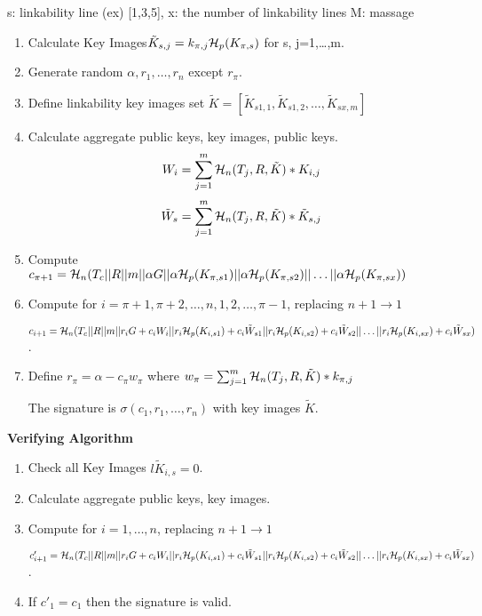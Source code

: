     s: linkability line (ex) [1,3,5],  x: the number of linkability lines M: massage
    \begin{enumerate}
        \item Calculate Key Images$\tilde{K}_{s,j}=k_{\pi,j}{\cal H}_{p} (K_{\pi,s})$ for s, j=1,\ldots,m.
        \item Generate random $\alpha,r_{1},\ldots,r_{n}$ except $r_{\pi}$.
        \item Define linkability key images set $\tilde{K}=[\tilde{K}_{s1,1},\tilde{K}_{s1,2},\ldots,\tilde{K}_{sx,m}]$
        \item Calculate aggregate public keys, key images, public keys.
         $$ W_{i}= \sum^{m}_{j=1} {\cal H}_{n}(T_{j},R,\tilde{K})*K_{i,j} $$
        $$ \tilde{W}_{s}= \sum^{m}_{j=1} {\cal H}_{n}(T_{j},R,\tilde{K})*\tilde{K}_{s,j} $$
        \item Compute $c_{\pi+1}={\cal H}_{n}(T_{c}||R||m||\alpha G||\alpha {\cal H}_{p}(K_{\pi,s1})||\alpha {\cal H}_{p}(K_{\pi,s2})||\ldots||\alpha {\cal H}_{p}(K_{\pi,sx})) $
        \item Compute for $i=\pi +1,\pi +2,\ldots,n,1,2,\ldots,\pi -1$, replacing $n+1 \rightarrow 1$
        
        $c_{i+1}={\cal H}_{n}(T_{c}||R||m||r_{i}G+c_{i}W_{i}||r_{i}{\cal H}_{p}(K_{i,s1})+c_{i} \tilde{W}_{s1}||r_{i}{\cal H}_{p}(K_{i,s2})+c_{i} \tilde{W}_{s2}||\ldots||r_{i}{\cal H}_{p}(K_{i,sx})+c_{i} \tilde{W}_{sx}) $.
        \item Define $r_{\pi}=\alpha - c_{\pi} w_{\pi}$ where $w_{\pi}=\sum^{m}_{j=1} {\cal H}_{n}(T_{j},R,\tilde{K})*k_{\pi,j}$
        
        The signature is $\sigma (c_{1},r_{1},\ldots,r_{n})$ with key images $\tilde{K}$.
    \end{enumerate}
    
    \textbf{Verifying Algorithm}
    \begin{enumerate}
        \item Check all Key Images $l\tilde{K}_{i,s}=0$.
        \item Calculate aggregate public keys, key images.
        \item Compute for $i=1,\ldots,n$, replacing $n+1 \rightarrow 1$
        
        $c'_{i+1}={\cal H}_{n}(T_{c}||R||m||r_{i}G+c_{i}W_{i}||r_{i}{\cal H}_{p}(K_{i,s1})+c_{i} \tilde{W}_{s1}||r_{i}{\cal H}_{p}(K_{i,s2})+c_{i} \tilde{W}_{s2}||\ldots||r_{i}{\cal H}_{p}(K_{i,sx})+c_{i} \tilde{W}_{sx}) $.
        \item If $c'_{1}=c_{1}$ then the signature is valid.
    \end{enumerate}
    
